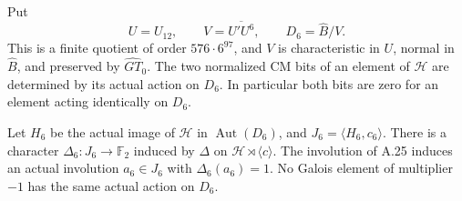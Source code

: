 Put
\[
 U=U_{12},\qquad V=\overline{U'U^6},\qquad D_6=\widehat B/V.
\]
This is a finite quotient of order \(576\cdot6^{97}\),
and \(V\) is characteristic in \(U\), normal in
\(\widehat B\), and preserved by \(\widehat{GT}_0\).
The two normalized CM bits of an element of
\(\mathcal H\) are determined by its actual action
on \(D_6\). In particular both bits are zero for
an element acting identically on \(D_6\).

Let \(H_6\) be the actual image of \(\mathcal H\)
in \(\operatorname{Aut}(D_6)\), and
\(J_6=\langle H_6,c_6\rangle\). There is a
character \(\Delta_6:J_6\to\mathbb F_2\) induced
by \(\Delta\) on
\(\mathcal H\rtimes\langle c\rangle\).
The involution of A.25 induces an actual involution
\(a_6\in J_6\) with \(\Delta_6(a_6)=1\).
No Galois element of multiplier \(-1\) has the
same actual action on \(D_6\).

